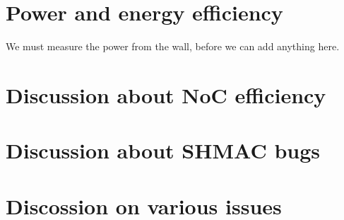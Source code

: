 \section{Power and energy efficiency}

We must measure the power from the wall, before we can add anything here.

\section{Discussion about NoC efficiency}
\section{Discussion about SHMAC bugs}

\section{Discossion on various issues}
%




